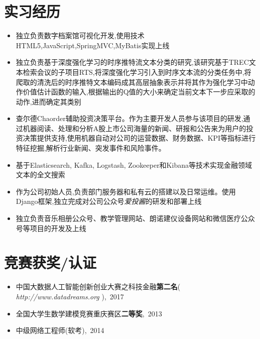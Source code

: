 \documentclass{resume}
\begin{document}

\section{实习经历}
\begin{itemize}
  \item 独立负责数字档案馆可视化开发,使用技术HTML5,JavaScript,SpringMVC,MyBatis实现上线
  \item 独立负责基于深度强化学习的时序推特流文本分类的研究,该研究基于TREC文本检索会议的子项目RTS,将深度强化学习引入到时序文本流的分类任务中,将爬取的清洗后的时序推特文本编码成其高层抽象表示并将其作为强化学习中动作价值估计函数的输入,根据输出的Q值的大小来确定当前文本下一步应采取的动作,进而确定其类别
\end{itemize}

\begin{itemize}
  \item 查尔德Chaorder辅助投资决策平台。作为主要开发人员参与该项目的研发,通过机器阅读、处理和分析A股上市公司海量的新闻、研报和公告来为用户的投资决策提供支持,使用机器自动对公司的运营数据、财务数据、KPI等指标进行特征挖掘,解析行业新闻、突发事件和风险事件。
  \item 基于Elasticsearch, Kafka, Logstash, Zookeeper和Kibana等技术实现金融领域文本的全文搜索
  \item 作为公司初始人员,负责部门服务器和私有云的搭建以及日常运维。使用Django框架,独立完成对公司公众号\textit{爱投酱}的研发和部署上线
\end{itemize}

\begin{itemize}
  \item 独立负责音乐相册公众号、教学管理网站、朗诺建仪设备网站和微信医疗公众号等项目的开发及上线
\end{itemize}

\section{竞赛获奖/认证}
\begin{itemize}[parsep=0.2ex]
  \item 中国大数据人工智能创新创业大赛之科技金融\textbf{第二名}( \textit{http://www.datadreams.org} ),\ 2017
  \item 全国大学生数学建模竞赛重庆赛区\textbf{二等奖},\ 2013
  \item 中级网络工程师(软考),\ 2014
\end{itemize}
\end{document}
